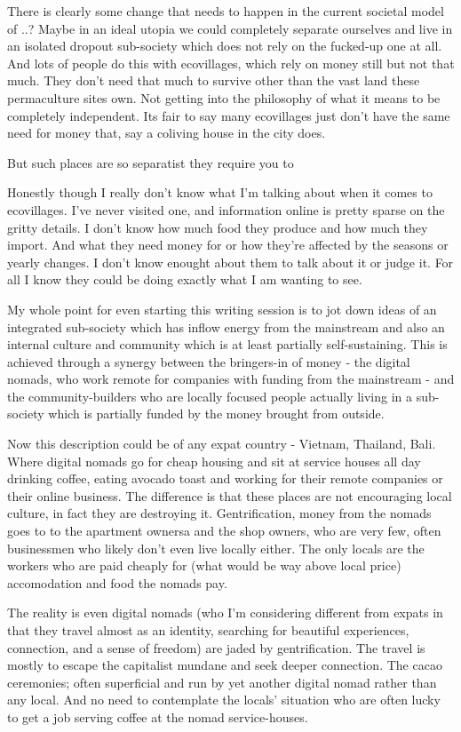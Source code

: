 There is clearly some change that needs to happen in the current societal model of ..? Maybe in an ideal utopia we could completely separate ourselves and live in an isolated dropout sub-society which does not rely on the fucked-up one at all. And lots of people do this with ecovillages, which rely on money still but not that much. They don't need that much to survive other than the vast land these permaculture sites own. Not getting into the philosophy of what it means to be completely independent. Its fair to say many ecovillages just don't have the same need for money that, say a coliving house in the city does.

But such places are so separatist they require you to 

Honestly though I really don't know what I'm talking about when it comes to ecovillages. I've never visited one, and information online is pretty sparse on the gritty details. I don't know how much food they produce and how much they import. And what they need money for or how they're affected by the seasons or yearly changes. I don't know enought about them to talk about it or judge it. For all I know they could be doing exactly what I am wanting to see.

My whole point for even starting this writing session is to jot down ideas of an integrated sub-society which has inflow energy from the mainstream and also an internal culture and community which is at least partially self-sustaining. This is achieved through a synergy between the bringers-in of money - the digital nomads, who work remote for companies with funding from the mainstream - and the community-builders who are locally focused people actually living in a sub-society which is partially funded by the money brought from outside.

Now this description could be of any expat country - Vietnam, Thailand, Bali. Where digital nomads go for cheap housing and sit at service houses all day drinking coffee, eating avocado toast and working for their remote companies or their online business. The difference is that these places are not encouraging local culture, in fact they are destroying it. Gentrification, money from the nomads goes to to the apartment ownersa and the shop owners, who are very few, often businessmen who likely don't even live locally either. The only locals are the workers who are paid cheaply for (what would be way above local price) accomodation and food the nomads pay.

The reality is even digital nomads (who I'm considering different from expats in that they travel almost as an identity, searching for beautiful experiences, connection, and a sense of freedom) are jaded by gentrification. The travel is mostly to escape the capitalist mundane and seek deeper connection. The cacao ceremonies; often superficial and run by yet another digital nomad rather than any local. And no need to contemplate the locals' situation who are often lucky to get a job serving coffee at the nomad service-houses.

